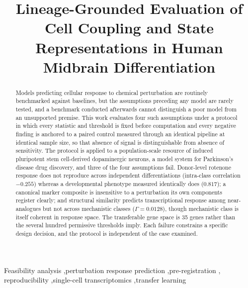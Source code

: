 \documentclass[5p,times,twocolumn]{elsarticle}
\begin{document}
\begin{frontmatter}

\title{Lineage-Grounded Evaluation of Cell Coupling and State Representations in Human Midbrain Differentiation}





\begin{abstract}
Models predicting cellular response to chemical perturbation are routinely
benchmarked against baselines, but the assumptions preceding any model are
rarely tested, and a benchmark conducted afterwards cannot distinguish a poor
model from an unsupported premise. This work evaluates four such assumptions
under a protocol in which every statistic and threshold is fixed before
computation and every negative finding is anchored to a paired control measured through an identical pipeline at identical sample size, so that
absence of signal is distinguishable from absence of sensitivity. The protocol
is applied to a population-scale resource of induced pluripotent stem
cell-derived dopaminergic neurons, a model system for Parkinson's disease drug
discovery, and three of the four assumptions fail. Donor-level rotenone
response does not reproduce across independent differentiations (intra-class
correlation $-0.255$) whereas a developmental phenotype measured identically
does ($0.817$); a canonical marker composite is insensitive to a perturbation
its own components register clearly; and structural similarity predicts
transcriptional response among near-analogues but not across mechanistic
classes ($\Gamma = 0.0128$), though mechanistic class is itself coherent in
response space. The transferable gene space is 35 genes rather than the several
hundred permissive thresholds imply. Each failure constrains a specific design
decision, and the protocol is independent of the case examined.
\end{abstract}

\begin{keyword}
Feasibility analysis \sep perturbation response prediction \sep pre-registration \sep
reproducibility \sep single-cell transcriptomics \sep transfer learning
\end{keyword}

\end{frontmatter}
\end{document}

